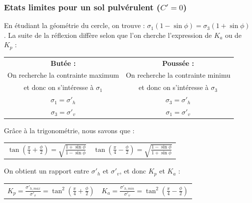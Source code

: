         \subsubsection{Etats limites pour un sol pulvérulent ($C' = 0$)}
            En étudiant la géométrie du cercle, on trouve : $\sigma_1 (1 -\sin \phi) = \sigma_3 (1 + \sin \phi)$. 
            La suite de la réflexion diffère selon que l'on cherche l'expression de $K_a$ ou de $K_p$ :
            
            \begin{center}
            \begin{tabular}{c | c}
                \textbf{Butée :} & \textbf{Poussée :} \\
                    On recherche la contrainte maximum & On recherche la contrainte minimu \\
                     et donc on s'intéresse à $\sigma_1$  & 
                     et donc on s'intéresse à $\sigma_3$ \\
                    $\sigma_1 = \sigma'_h$ & $\sigma_3 = \sigma'_h$ \\
                    $\sigma_3 = \sigma'_v$ & $\sigma_1 = \sigma'_v$ 
            \end{tabular}
            \end{center}
            
            Grâce à la trigonométrie, nous savons que :
            
            \begin{center}
            \begin{tabular}{c|c}
                $\tan(\frac{\pi}{4}+\frac{\phi}{2}) = \sqrt{\frac{1+\sin \phi}{1-\sin \phi}}$ \: \:&
                $\tan(\frac{\pi}{4}-\frac{\phi}{2}) = \sqrt{\frac{1-\sin \phi}{1+\sin \phi}}$ \\
            \end{tabular}
            \end{center}
            
            On obtient un rapport entre $\sigma'_h$ et $\sigma'_v$, et donc $K_p$ et $K_a$ :
            
            \begin{center}
            \begin{tabular}{c|c}
                $K_p = \frac{\sigma'_{h,max}}{\sigma'_v} = \tan^2(\frac{\pi}{4}+\frac{\phi}{2})$ \: \:&
                $K_a = \frac{\sigma'_{h,min}}{\sigma'_v} = \tan^2(\frac{\pi}{4}-\frac{\phi}{2})$ 
            \end{tabular}
            \end{center}
            
